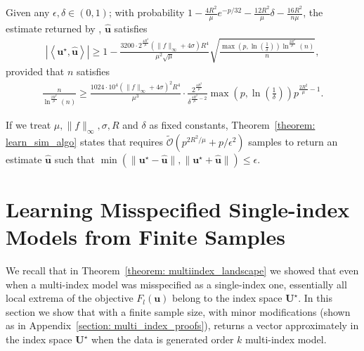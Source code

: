 \documentclass[final,12pt]{colt2018} %
\renewcommand\v[1]{{\ensuremath{\boldsymbol{#1}}}}
\newcommand\ip[1]{\left\langle #1 \right\rangle}
\newcommand{\todor}[1]{{\color{red} #1}}
\begin{document}
\begin{theorem}
\label{theorem: learn_sim_algo}
Given any $\epsilon,\delta \in (0,1)$; with probability $1- \frac{4R^2}{\mu} e^{-p/32} - \frac{12R^2}{\mu}\delta - \frac{16R^2}{n\mu}$, the estimate returned by , $\hat{\v u}$ satisfies
\begin{align*}
    |\ip{\v u^\star, \hat{\v u}} | \geq 1 - \frac{3200 \cdot 2^{\frac{4R^2}{\mu}}(\|f\|_\infty + 4 \sigma)R^4}{\mu^2\sqrt{\mu}} \sqrt{\frac{\max\left(p,\ln \left(\frac{1}{\delta}\right)\right)\ln^{\frac{2R^2}{\mu}}(n)}{n}} ,
\end{align*}
provided that $n$ satisfies
\begin{align*}
 \frac{n}{ \ln^{\frac{2R^2}{\mu}}(n)} \geq \frac{1024 \cdot 10^4 (\|f\|_\infty + 4\sigma)^2 R^4}{\mu^3} \cdot \frac{2^{\frac{4R^2}{\mu}}}{\delta^{\frac{4R^2}{\mu}-2}} \max\left(p, \ln \left( \frac{1}{\delta} \right) \right) p^{\frac{2R^2}{\mu}-1}.
\end{align*}
\end{theorem}
\begin{remark} If we treat $\mu, \|f\|_\infty, \sigma,R$ and $\delta$ as fixed constants, Theorem~\ref{theorem: learn_sim_algo} states that  requires $\tilde{\mathcal{O}}( p^{2R^2/\mu} + p/\epsilon^2 )$ samples to return an estimate $\hat{\v u}$ such that $\min(\| \v u^\star - \hat{\v u} \|, \| \v u^\star + \hat{\v u} \|) \leq \epsilon$. 
\end{remark}


\section{Learning Misspecified Single-index Models from Finite Samples}
\label{section: multi_index}
We recall that in Theorem~\ref{theorem: multiindex_landscape} we showed that even when a multi-index model was misspecified as a single-index one, essentially all local extrema of the objective $F_l(\v u)$ belong to the index space $\mathcal{\v U}^\star$. In this section we show that with a finite sample size, with minor modifications (shown as  in Appendix~\ref{section: multi_index_proofs}),  returns a vector approximately in the index space $\mathcal{\v U}^\star$ when the data is generated order $k$ multi-index model. 
\end{document}
